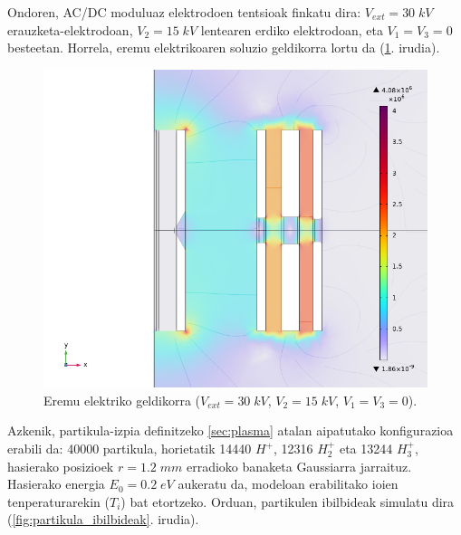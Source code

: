 \documentclass[12pt]{article}
\numberwithin{figure}{section}
\numberwithin{equation}{section}
\begin{document}
Ondoren, AC/DC moduluaz elektrodoen tentsioak finkatu dira: $V_{ext}=30\;kV$ erauzketa-elektrodoan, $V_2=15\;kV$ lentearen erdiko elektrodoan, eta $V_1=V_3=0$ besteetan. Horrela, eremu elektrikoaren soluzio geldikorra lortu da (\ref{fig:eremugeldikor}. irudia).

\begin{figure}[h]
    \centering
    \includegraphics[width=0.5\linewidth]{3 - COMSOL/eremu_elektrikoa.png}
    \caption{Eremu elektriko geldikorra ($V_{ext}=30\;kV$, $V_2=15\;kV$, $V_1=V_3=0$).}
    \label{fig:eremugeldikor}
\end{figure}

Azkenik, partikula-izpia definitzeko \ref{sec:plasma} atalan aipatutako konfigurazioa erabili da: 40000 partikula, horietatik 14440 $H^+$, 12316 $H_2^+$ eta 13244 $H_3^+$, hasierako posizioek $r=\num{1.2}\;mm$ erradioko banaketa Gaussiarra jarraituz. Hasierako energia $E_0=\num{0.2}\;eV$ aukeratu da, modeloan erabilitako ioien tenperaturarekin ($T_i$) bat etortzeko. Orduan, partikulen ibilbideak simulatu dira (\ref{fig:partikula_ibilbideak}. irudia).
\end{document}

